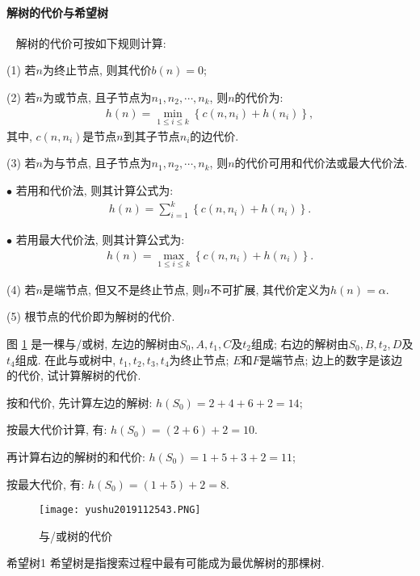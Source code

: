 \paragraph{解树的代价与希望树}~{}
解树的代价可按如下规则计算:

(1) 若$n$为终止节点, 则其代价$b(n)=0$;

(2) 若$n$为或节点, 且子节点为$n_1, n_2, \cdots, n_k$, 则$n$的代价为:
    \begin{align}
        h(n)=\min _{1 \leq i \leq k}\left\{c\left(n, n_{i}\right)+h\left(n_{i}\right)\right\},
    \end{align}
其中, $c(n, n_i )$是节点$n$到其子节点$n_i$的边代价.

(3) 若$n$为与节点, 且子节点为$n_1, n_2,\cdots,n_k$, 则$n$的代价可用和代价法或最大代价法.

    $\bullet$ 若用和代价法, 则其计算公式为:
    \begin{align}
        h(n)=\sum_{i=1}^{k}\left\{c\left(n, n_{i}\right)+h\left(n_{i}\right)\right\}.
    \end{align}

    $\bullet$ 若用最大代价法, 则其计算公式为:
    \begin{align}
        h(n)=\max _{1 \leq i \leq k}\left\{c\left(n, n_{i}\right)+h\left(n_{i}\right)\right\}.
    \end{align}

(4) 若$n$是端节点, 但又不是终止节点, 则$n$不可扩展, 其代价定义为$h(n)=\alpha$.

(5) 根节点的代价即为解树的代价.
\begin{example}
    图 \ref{AI32fig43} 是一棵与/或树, 左边的解树由$S_0,A,t_1,C$及$t_2$组成; 右边的解树由$S_0,B,t_2,D$及$t_4$组成.
在此与或树中, $t_1,t_2,t_3,t_4$为终止节点; $E$和$F$是端节点; 边上的数字是该边的代价, 试计算解树的代价.
\end{example}
\begin{result}
按和代价, 先计算左边的解树: $h(S_0)=2+4+6+2=14$;

按最大代价计算, 有: $h(S_0)=(2+6)+2=10$.

再计算右边的解树的和代价: $h(S_0)=1+5+3+2=11$;

按最大代价, 有: $h(S_0)=(1+5)+2=8$.
\begin{figure}[H]
    \centering
    \texttt{[image: yushu2019112543.PNG]}
     \vspace{-0.5cm}
    \caption{与/或树的代价}
    \label{AI32fig43}
\end{figure}
\end{result}
\begin{mydef}{希望树}{1}
    希望树是指搜索过程中最有可能成为最优解树的那棵树.
\end{mydef}

